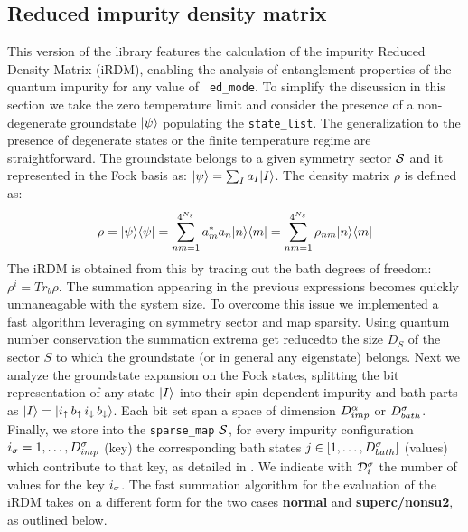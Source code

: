 \documentclass[edipack2.tex]{subfiles}
\begin{document}
\subsection{Reduced impurity density matrix}\label{sSecRDM}
This version of the \NAME library features the calculation of the
impurity Reduced Density Matrix (iRDM), enabling the analysis of
entanglement properties of the quantum impurity for any value of {\tt
  ed\_mode}.
To simplify the discussion in this section we take the zero
temperature limit and consider the presence of a non-degenerate
groundstate $|\psi\rangle$ populating the {\tt state\_list}.
The generalization to the presence of degenerate states or the finite
temperature regime are straightforward.
The groundstate belongs to a given symmetry sector ${\cal S}$ and it
represented in the Fock basis as:  $|\psi\rangle = \sum_I a_I |I\rangle$. 
The density matrix $\rho$ is defined as:
$$
\rho = |\psi\rangle\langle \psi| = \sum_{nm=1}^{4^{N_s}} a^*_ma_n |n\rangle\langle m| =\sum_{nm=1}^{4^{N_s}} \rho_{nm} |n\rangle\langle m| 
$$
The iRDM is obtained from this by tracing out the bath degrees of
freedom: $\rho^{i}=Tr_{b}\rho$. The summation appearing in the
previous expressions becomes quickly unmaneagable with the system
size. To overcome this issue we implemented a fast algorithm
leveraging on symmetry sector and map sparsity.
Using quantum number conservation the summation extrema get reducedto
the size $D_S$ of the sector $S$ to which the groundstate (or in
general any eigenstate) belongs. 
Next we analyze the groundstate expansion on the Fock states, splitting the bit representation of any state $|I\rangle$ into
their spin-dependent impurity and bath parts as $|I\rangle = |
  i_\uparrow\,  b_\uparrow\, i_\downarrow \, b_\downarrow\rangle$. Each bit
set span a space of dimension $D^\alpha_{imp}$ or $D^\sigma_{bath}$. 
Finally, we store into the {\tt sparse\_map} ${\cal S}$, for every impurity configuration 
$i_\sigma =1,\dots,D^\sigma_{imp}$ (key) the corresponding bath states $j\in[1,\dots,D^\sigma_{bath}]$
(values) which contribute to that key, as detailed in
.
We indicate with ${\cal D}^\sigma_{i}$ the number of values for the key $i_\sigma$.
The fast summation algorithm for the evaluation of the iRDM takes on a
different form for the two cases {\bf normal} and {\bf superc/nonsu2},
as outlined below.
\end{document}

